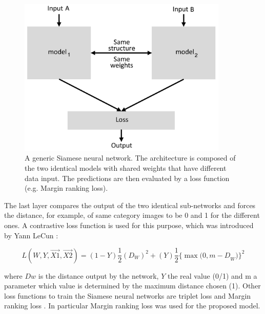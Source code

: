 \begin{figure}
	\centering
	\includegraphics[width=10cm]{img/siamese.png}
	\caption{A generic Siamese neural network. The architecture is composed of the two identical models with shared weights that have different data input. The predictions are then evaluated by a loss function (e.g. Margin ranking loss).}
	\label{siamese_fig}
\end{figure}

The last layer compares the output of the two identical sub-networks and forces the distance, for example, of same category images to be 0 and 1 for the different ones. A contrastive loss function is used for this purpose, which was introduced by Yann LeCun \cite{hadsell2006dimensionality}:

\begin{equation}
L(W, Y, \overrightarrow{X1}, \overrightarrow{X2})=(1-Y)\frac{1}{2}(D_{W})^2 +(Y)\frac{1}{2}\{\max{(0,m-D}_{W})\}^2
\end{equation}

where $Dw$ is the distance output by the network, $Y$ the real value (0/1) and m a parameter which value is determined by the maximum distance chosen (1).
Other loss functions to train the Siamese neural networks are triplet loss \cite{triplet_loss} and Margin ranking loss \cite{rankingloss}. In particular Margin ranking loss was used for the proposed model.